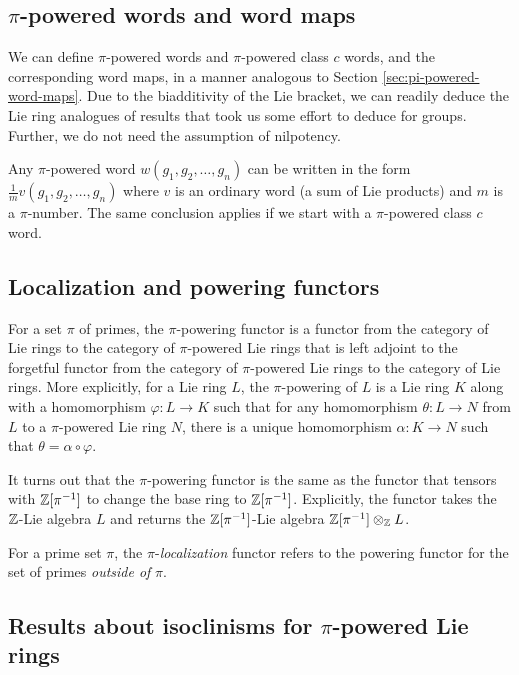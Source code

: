 \subsection{$\pi$-powered words and word maps}

We can define $\pi$-powered words and $\pi$-powered class $c$ words,
and the corresponding word maps, in a manner analogous to Section
\ref{sec:pi-powered-word-maps}. Due to the biadditivity of the Lie
bracket, we can readily deduce the Lie ring analogues of results that
took us some effort to deduce for groups. Further, we do not need the
assumption of nilpotency.

Any $\pi$-powered word $w(g_1,g_2,\dots,g_n)$ can be written in the
form $\frac{1}{m}v(g_1,g_2,\dots,g_n)$ where $v$ is an ordinary word
(a sum of Lie products) and $m$ is a $\pi$-number. The same conclusion
applies if we start with a $\pi$-powered class $c$ word.

\subsection{Localization and powering functors}\label{sec:localization-and-powering-functors-lie}

For a set $\pi$ of primes, the $\pi$-powering functor is a functor
from the category of Lie rings to the category of $\pi$-powered Lie rings
that is left adjoint to the forgetful functor from the category of
$\pi$-powered Lie rings to the category of Lie rings. More explicitly, for a
Lie ring $L$, the $\pi$-powering of $L$ is a Lie ring $K$ along with a
homomorphism $\varphi:L \to K$ such that for any homomorphism
$\theta:L \to N$ from $L$ to a $\pi$-powered Lie ring $N$, there is a
unique homomorphism $\alpha:K \to N$ such that $\theta = \alpha \circ
\varphi$.

It turns out that the $\pi$-powering functor is the same as the
functor that tensors with $\mathbb{Z}[\pi^{-1}]$ to change the base ring to
$\mathbb{Z}[\pi^{-1}]$. Explicitly, the functor takes the $\mathbb{Z}$-Lie algebra $L$
and returns the $\mathbb{Z}[\pi^{-1}]$-Lie algebra $\mathbb{Z}[\pi^{-1}] \otimes_{\mathbb{Z}} L$.

For a prime set $\pi$, the $\pi$-{\em localization} functor refers to
the powering functor for the set of primes {\em outside of} $\pi$.

\subsection{Results about isoclinisms for $\pi$-powered Lie rings}\label{sec:pi-powered-isoclinism-results-lie}


